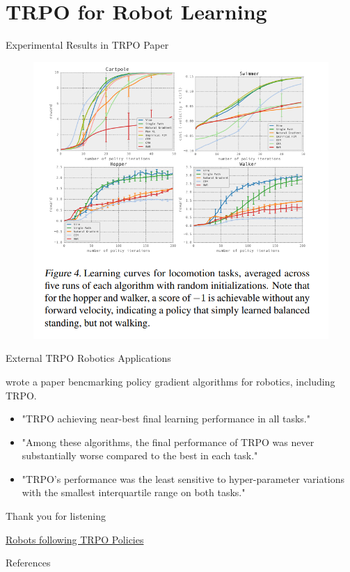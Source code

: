 \documentclass{beamer}
\begin{document}
\section{TRPO for Robot Learning}
\begin{frame}{Experimental Results in TRPO Paper}    

\begin{figure}
    \centering
    \includegraphics[width=0.8\linewidth]{trpo_experimental_results.png}
    \label{fig:exp_results}
\end{figure}


\end{frame}

\begin{frame}{External TRPO Robotics Applications}    

\cite{benchmark_robots} wrote a paper bencmarking policy gradient algorithms for robotics, including TRPO. 
\begin{itemize}
    \item "TRPO achieving near-best final learning performance in all tasks." 
    \item "Among these algorithms, the final performance of TRPO was never substantially worse compared to the best in each task."
    \item  "TRPO’s performance was the least sensitive to hyper-parameter variations with the smallest interquartile range on both tasks."
\end{itemize}

\end{frame}

\begin{frame}{Thank you for listening}

\href{https://www.youtube.com/watch?v=ovDfhvjpQd8&t=387s}{Robots following TRPO Policies}


\end{frame}


\begin{frame}{References}
    
    
\end{frame}
\end{document}

